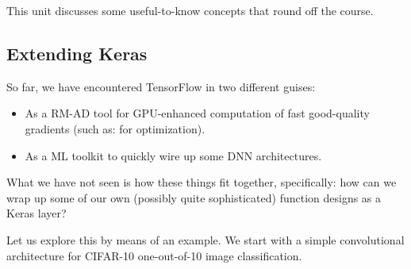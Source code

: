 \documentclass[11pt]{article}
\providecommand{\tightlist}{%
      \setlength{\itemsep}{0pt}\setlength{\parskip}{0pt}}
\begin{document}
This unit discusses some useful-to-know concepts that round off the
course.

    \hypertarget{extending-keras}{%
\subsection{Extending Keras}\label{extending-keras}}

So far, we have encountered TensorFlow in two different guises:

\begin{itemize}
\tightlist
\item
  As a RM-AD tool for GPU-enhanced computation of fast good-quality
  gradients (such as: for optimization).
\item
  As a ML toolkit to quickly wire up some DNN architectures.
\end{itemize}

What we have not seen is how these things fit together, specifically:
how can we wrap up some of our own (possibly quite sophisticated)
function designs as a Keras layer?

Let us explore this by means of an example. We start with a simple
convolutional architecture for CIFAR-10 one-out-of-10 image
classification.
\end{document}

